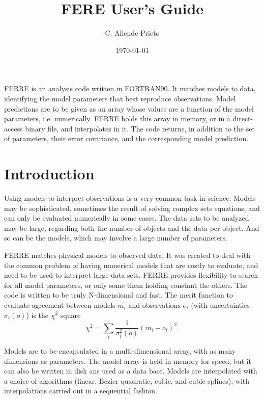 \documentclass[12pt]{article}
\begin{document}
\title{FERE User's Guide}

\date{\today}
\author{C. Allende Prieto}

\maketitle

FERRE is an analysis code written in FORTRAN90. 
It matches models to data,  
identifying the model parameters that best
reproduce observations. 
Model predictions are to be given as an array whose values are a function of 
the model parameters, i.e. numerically. 
FERRE holds this array in memory, or in a direct-access binary file,
and interpolates in it. The code returns, in addition to the 
set of parameters, their error covariance, and the corresponding model prediction. 

\tableofcontents


\section{Introduction}
\label{intro}

Using models to interpret observations is a very common task in 
science. Models may be sophisticated, sometimes the result 
of solving complex sets equations, and can only be evaluated numerically 
in some cases. The data sets to be analyzed may be large, regarding both 
the number of objects and the data per object. And so can be the models, 
which may involve a large number of parameters. 

FERRE matches physical models to observed data. It was created to 
deal with the common problem of having numerical models that are
costly to evaluate, and need to be used to interpret large data sets.
FERRE provides flexibility to search for all model parameters, or 
only some them holding constant the others. The code is written
to be truly N-dimensional and fast. The merit function to evaluate 
agreement between models ${m_i}$ and observations ${o_i}$ 
(with uncertainties ${\sigma_i(o)}$) is the $\chi^2$ square
\begin{equation}
\chi^2 = \sum_i \frac{1}{\sigma_i^2(o)} (m_i - o_i)^2.
\end{equation}

Models are to be
encapsulated in a multi-dimensional array, with as many dimensions
as parameters. The model array is held in memory for speed, but it can
also be written in disk ans used as a data base. Models are interpolated with a choice
of algorithms (linear, Bezier quadratic, cubic, and cubic splines), with 
interpolations carried out in a sequential fashion. 
\end{document}
